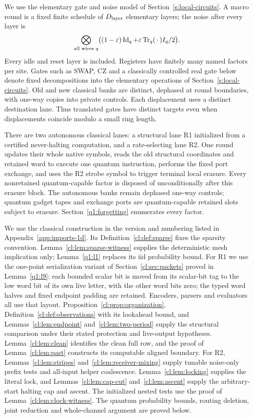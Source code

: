 We use the elementary gate and noise model of Section~\ref{s:local-circuits}. A macro round is a fixed finite schedule of \(D_{\rm layer}\) elementary layers; the noise after every layer is
\[
 \bigotimes_{\text{all wires }q}\bigl((1-\varepsilon)\operatorname{Id}_q+
 \varepsilon\operatorname{Tr}_q(\,\cdot\,)I_q/2\bigr).
\]
Every idle and reset layer is included. Registers have finitely many named factors per site. Gates such as SWAP, CZ and a classically controlled real gate below denote fixed decompositions into the elementary operations of Section~\ref{s:local-circuits}. Old and new classical banks are distinct, dephased at round boundaries, with one-way copies into private controls. Each displacement uses a distinct destination lane. Thus translated gates have distinct targets even when displacements coincide modulo a small ring length.

There are two autonomous classical lanes: a structural lane R1 initialized from a certified never-halting computation, and a rate-selecting lane R2. One round updates their whole native symbols, reads the old structural coordinates and retained word to execute one quantum instruction, performs the fixed port exchange, and uses the R2 strobe symbol to trigger terminal local erasure. Every nonretained quantum-capable factor is disposed of unconditionally after this erasure block. The autonomous banks remain dephased one-way controls; quantum gadget tapes and exchange ports are quantum-capable retained slots subject to erasure. Section~\ref{q1:forgetting} enumerates every factor.

We use the classical construction \cite{DMNoise1D2026} in the version and numbering listed in Appendix~\ref{app:imports-1d}.
Its Definition~\ref*{cl:def:sparse} fixes the sparsity convention.
Lemma~\ref*{cl:lem:sparse-witness} supplies the deterministic mesh
implication only; Lemma~\ref{q1:l1} replaces its iid probability bound.
For R1 we use the one-point serialization variant of
Section~\ref*{cl:sec:packets} proved in Lemma~\ref{q1:l9}: each bounded
scalar bit is moved from its scalar-bit tag to the low word bit of its
own live letter, with the other word bits zero; the typed word halves
and fixed endpoint padding are retained. Encoders, parsers and evaluators
all use that layout. Proposition~\ref*{cl:prop:organization},
Definition~\ref*{cl:def:observations} with its lookahead bound, and
Lemmas~\ref*{cl:lem:endpoint} and~\ref*{cl:lem:two-period} supply the
structural comparison under their stated protection and live-output
hypotheses. Lemma~\ref*{cl:lem:clean} identifies the clean full row,
and the proof of Lemma~\ref*{cl:lem:past} constructs its computable
aligned boundary. For R2, Lemmas~\ref*{cl:lem:stripes}
and~\ref*{cl:lem:receiver-mixing} supply tunable noise-only prefix tests
and all-input helper coalescence. Lemma~\ref*{cl:lem:locking} supplies
the literal lock, and Lemmas~\ref*{cl:lem:cap-cut}
and~\ref*{cl:lem:ascent} supply the arbitrary-start halting cap and
ascent. The initialized nested tests use the proof of
Lemma~\ref*{cl:lem:clock-witness}. The quantum probability bounds,
routing deletion, joint reduction and whole-channel argument are proved
below.

